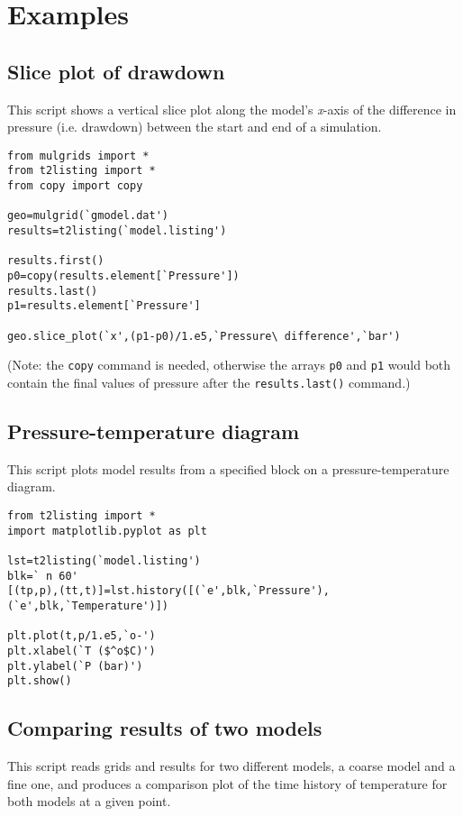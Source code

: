 \section{Examples}

\subsection{Slice plot of drawdown}

This script shows a vertical slice plot along the model's \emph{x}-axis of the difference in pressure (i.e. drawdown) between the start and end of a simulation.

\begin{verbatim}
from mulgrids import *
from t2listing import *
from copy import copy

geo=mulgrid(`gmodel.dat')
results=t2listing(`model.listing')

results.first()
p0=copy(results.element[`Pressure'])
results.last()
p1=results.element[`Pressure']

geo.slice_plot(`x',(p1-p0)/1.e5,`Pressure\ difference',`bar')
\end{verbatim}

(Note: the \texttt{copy} command is needed, otherwise the arrays \texttt{p0} and \texttt{p1} would both contain the final values of pressure after the \texttt{results.last()} command.)

\subsection{Pressure-temperature diagram}

This script plots model results from a specified block on a pressure-temperature diagram.

\begin{verbatim}
from t2listing import *
import matplotlib.pyplot as plt

lst=t2listing(`model.listing')
blk=` n 60'
[(tp,p),(tt,t)]=lst.history([(`e',blk,`Pressure'),(`e',blk,`Temperature')])

plt.plot(t,p/1.e5,`o-')
plt.xlabel(`T ($^o$C)')
plt.ylabel(`P (bar)')
plt.show()
\end{verbatim}

\subsection{Comparing results of two models}
\label{comparison_example}

This script reads grids and results for two different models, a coarse model and a fine one, and produces a comparison plot of the time history of temperature for both models at a given point.

